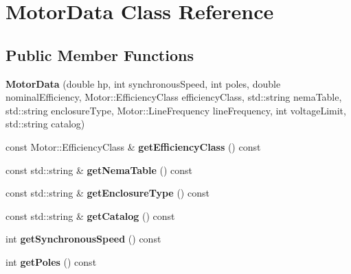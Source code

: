 \hypertarget{class_motor_data}{}\section{Motor\+Data Class Reference}
\label{class_motor_data}
\subsection*{Public Member Functions}
\begin{DoxyCompactItemize}
\item 
\mbox{\label{class_motor_data_a1308670141643b63365eef37069f03b6}} 
{\bfseries Motor\+Data} (double hp, int synchronous\+Speed, int poles, double nominal\+Efficiency, Motor\+::\+Efficiency\+Class efficiency\+Class, std\+::string nema\+Table, std\+::string enclosure\+Type, Motor\+::\+Line\+Frequency line\+Frequency, int voltage\+Limit, std\+::string catalog)
\item 
\mbox{\label{class_motor_data_aecd23c875ddfeabe929ebed8d67b89e5}} 
const Motor\+::\+Efficiency\+Class \& {\bfseries get\+Efficiency\+Class} () const
\item 
\mbox{\label{class_motor_data_a1b21d696b995840c19030f8eaf3d00ed}} 
const std\+::string \& {\bfseries get\+Nema\+Table} () const
\item 
\mbox{\label{class_motor_data_ae63075e0e1b2ee0e7e0ffee9f5b55890}} 
const std\+::string \& {\bfseries get\+Enclosure\+Type} () const
\item 
\mbox{\label{class_motor_data_ad0bea8d8fa674403b5d8c2b23734e5e6}} 
const std\+::string \& {\bfseries get\+Catalog} () const
\item 
\mbox{\label{class_motor_data_acad45303646e735784fd71b62c7cb459}} 
int {\bfseries get\+Synchronous\+Speed} () const
\item 
\mbox{\label{class_motor_data_a478432c15ca29fd1e66b86f9d223248f}} 
int {\bfseries get\+Poles} () const
\item 
\mbox{\label{class_motor_data_a8c9be0561a4e5d18cb1504cc36f5f4ef}} 

\end{DoxyCompactItemize}
